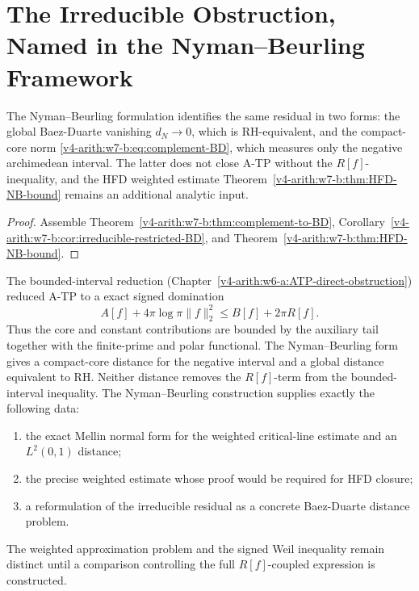 \section{The Irreducible Obstruction, Named in the Nyman--Beurling Framework}
\label{v4-arith:w7-b:irreducible-NB}

\begin{theorem}
\label{v4-arith:w7-b:thm:irreducible-NB}
The Nyman--Beurling formulation identifies the
same residual in two forms: the global Baez-Duarte vanishing
\(d_N\to0\), which is RH-equivalent, and the compact-core norm
\eqref{v4-arith:w7-b:eq:complement-BD}, which measures only the
negative archimedean interval. The latter does not close A-TP without
the \(R[f]\)-inequality, and the HFD weighted estimate
Theorem~\ref{v4-arith:w7-b:thm:HFD-NB-bound} remains an additional analytic
input.
\end{theorem}

\begin{proof}
Assemble Theorem~\ref{v4-arith:w7-b:thm:complement-to-BD},
Corollary~\ref{v4-arith:w7-b:cor:irreducible-restricted-BD}, and
Theorem~\ref{v4-arith:w7-b:thm:HFD-NB-bound}.
\end{proof}

\begin{remark}
\label{v4-arith:w7-b:rem:compare-w6}
The bounded-interval reduction (Chapter~\ref{v4-arith:w6-a:ATP-direct-obstruction}) reduced A-TP to a
exact signed domination
\[
 A[f]+4\pi\log\pi\|f\|_2^2\le B[f]+2\pi R[f].
\]
Thus the core and constant contributions are bounded by the auxiliary
tail together with the finite-prime and polar functional. The Nyman--Beurling
form gives a compact-core distance for the negative interval and a
global distance equivalent to RH. Neither distance removes the
\(R[f]\)-term from the bounded-interval inequality. The
Nyman--Beurling construction supplies exactly the following data:
\begin{enumerate}
\item the exact Mellin normal form for the weighted critical-line
estimate and an \(L^{2}(0,1)\) distance;
\item the precise weighted estimate whose proof would be required for
HFD closure;
\item a reformulation of the irreducible residual as a concrete
Baez-Duarte distance problem.
\end{enumerate}
The weighted approximation problem and the signed Weil inequality
remain distinct until a comparison controlling the full
\(R[f]\)-coupled expression is constructed.
\end{remark}

